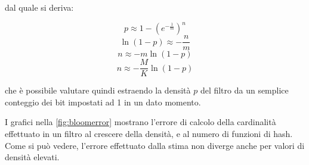 dal quale si deriva:

$$ p \approx 1-(e^{-\frac{1}{m}})^n $$
$$ \ln(1-p) \approx -\frac{n}{m} $$
$$ n \approx -m\ln(1-p) $$
\begin{equation} \label{eq:bloomcard}
n \approx -\frac{M}{K}\ln(1-p)
\end{equation}

che è possibile valutare quindi estraendo la densità $p$ del filtro da un semplice conteggio
dei bit impostati ad 1 in un dato momento.

I grafici nella \autoref{fig:bloomerror} mostrano l'errore di calcolo della cardinalità
effettuato in un filtro al crescere della densità, e al numero di funzioni di hash. Come si può
vedere, l'errore effettuato dalla stima non diverge anche per valori di densità elevati.

\begin{figure}
	\centering
	\begin{minipage}[c]{0.7\textwidth}
	\end{minipage}
	\qquad
	\begin{minipage}[c]{0.7\textwidth}
\end{minipage}
\end{figure}
